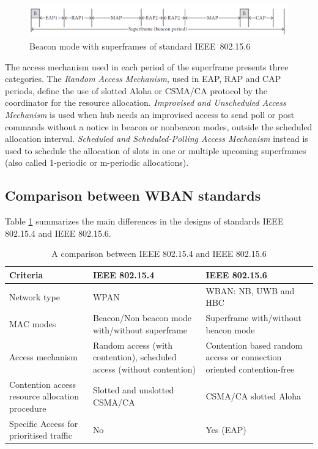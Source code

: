 \documentclass[conference]{IEEEtran}
\begin{document}
\begin{figure}[htbp]
	\centering
	\includegraphics[width=0.9\linewidth]{img/beaconModeSuperframe.png}
	\caption{Beacon mode with superframes of standard IEEE~802.15.6}
	\label{fig_beaconModeSuperframe}
\end{figure}

The access mechanism used in each period of the superframe presents three categories. The \textit{Random Access Mechanism}, used in EAP, RAP and CAP periods, define the use of slotted Aloha or CSMA/CA protocol by the coordinator for the resource allocation. \textit{Improvised and Unscheduled Access Mechanism} is used when hub needs an improvised access to send poll or post commands without a notice in beacon or nonbeacon modes, outside the scheduled allocation interval. \textit{Scheduled and Scheduled-Polling Access Mechanism} instead is used to schedule the allocation of slots in one or multiple upcoming superframes (also called 1-periodic or m-periodic allocations). \cite{kwak2010overview} \cite{ullah2013review}

\subsection{Comparison between WBAN standards}
Table \ref{tab2} \cite{salayma2017wireless} summarizes the main differences in the designs of standards IEEE 802.15.4 and IEEE 802.15.6.

\begin{table}[htbp]
	\caption{A comparison between IEEE 802.15.4 and IEEE 802.15.6}
	\begin{tabularx}{0.5\textwidth}{X|X|X|}
		\textbf{Criteria} & \textbf{IEEE 802.15.4} & \textbf{IEEE 802.15.6} \\
		\hline
		Network type & WPAN &  WBAN: NB, UWB and HBC\\
		\hline
		MAC modes &  Beacon/Non beacon mode with/without superframe & Superframe with/without beacon mode \\
		\hline
		Access mechanism &  Random access (with contention), scheduled access (without contention) & Contention based random access or connection oriented contention-free \\
		\hline
		Contention access resource allocation procedure	& Slotted and unslotted CSMA/CA & CSMA/CA slotted Aloha \\
		\hline
		Specific Access for prioritised traffic & No & Yes (EAP) \\
		\hline
	\end{tabularx}
	\label{tab2}
\end{table}
\end{document}
